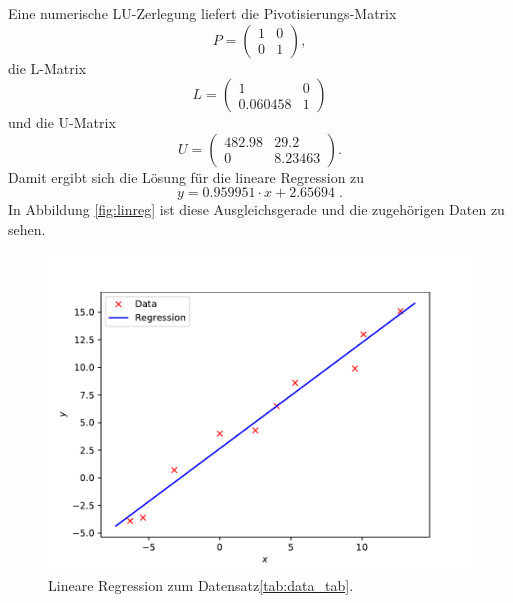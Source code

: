 \documentclass{article}
\begin{document}
Eine numerische LU-Zerlegung liefert die Pivotisierungs-Matrix
\[
P = 
\begin{pmatrix}
1 & 0\\
0 & 1
\end{pmatrix},
\]
die L-Matrix
\[
L = \begin{pmatrix}
       1    &   0\\
0.060458    &   1
\end{pmatrix}
\]
und die U-Matrix
\[
U = \begin{pmatrix}
 482.98 &  29.2\\
      0 & 8.23463
\end{pmatrix}.
\]
Damit ergibt sich die Lösung für die lineare Regression zu
\[
y = 0.959951\cdot x + 2.65694\; .
\]
In Abbildung \ref{fig:linreg} ist diese Ausgleichsgerade und die zugehörigen Daten zu sehen.
\begin{figure}
    \centering
    \includegraphics[width=\textwidth]{A2/build/Regression.pdf}
    \caption{Lineare Regression zum Datensatz\ref{tab:data_tab}.}
    \label{fig:my_label}
\end{figure}
\end{document}
